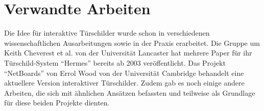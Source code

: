\chapter{Verwandte Arbeiten}
Die Idee für interaktive Türschilder wurde schon in verschiedenen wissenschaftlichen Ausarbeitungen sowie in der Praxis erarbeitet.
Die Gruppe um Keith Cheverest et al. von der Universität Lancaster hat mehrere Paper für ihr Türschild-System ``Hermes''\cite{cheverest:2003:paper} bereits ab 2003 veröffentlicht.
Das Projekt ``NetBoards'' von Errol Wood\cite{wood:2014} von der Universität Cambridge behandelt eine aktuellere Version interaktiver Türschilder.
Zudem gab es noch einige andere Arbeiten, die sich mit ähnlichen Ansätzen befassten und teilweise als Grundlage für diese beiden Projekte dienten.

